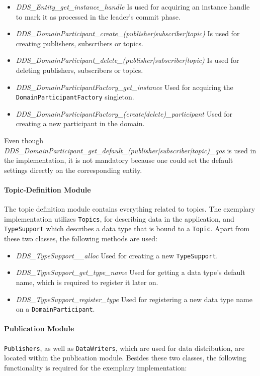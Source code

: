 \begin{itemize}
\item \textit{DDS\_Entity\_get\_instance\_handle} Is used for acquiring an instance handle to mark it as processed in the leader's commit phase.
\item \textit{DDS\_DomainParticipant\_create\_(publisher|subscriber|topic)} Is used for creating  publishers, subscribers or topics.
\item \textit{DDS\_DomainParticipant\_delete\_(publisher|subscriber|topic)} Is used for deleting  publishers, subscribers or topics.
\item \textit{DDS\_DomainParticipantFactory\_get\_instance} Used for acquiring the \texttt{DomainParticipantFactory} singleton.
\item \textit{DDS\_DomainParticipantFactory\_(create|delete)\_participant} Used for creating a new participant in the  domain.
\end{itemize}

Even though \textit{DDS\_DomainParticipant\_get\_default\_(publisher|subscriber|topic)\_qos} is used in the implementation, it is not mandatory because one could set the default  settings directly on the corresponding entity.

\paragraph{Topic-Definition Module}
The topic definition module contains everything related to topics.
The exemplary implementation utilizes \texttt{Topics}, for describing data in the application, and \texttt{TypeSupport} which describes a data type that is bound to a \texttt{Topic}.
Apart from these two classes, the following methods are used:

\begin{itemize}
\item \textit{DDS\_TypeSupport\_\_alloc} Used for creating a new \texttt{TypeSupport}.
\item \textit{DDS\_TypeSupport\_get\_type\_name} Used for getting a data type's default name, which is required to register it later on.
\item \textit{DDS\_TypeSupport\_register\_type} Used for registering a new data type name on a \texttt{DomainParticipant}.
\end{itemize}


\paragraph{Publication Module}
\texttt{Publishers}, as well as \texttt{DataWriters}, which are used for data distribution, are located within the publication module.
Besides these two classes, the following functionality is required for the exemplary implementation:

